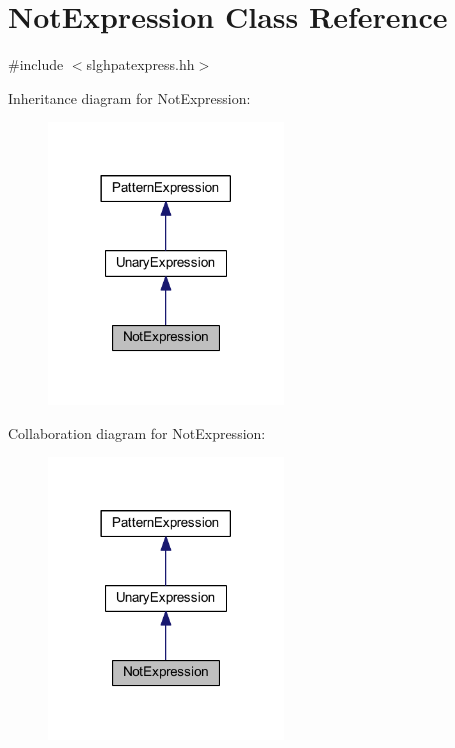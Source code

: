 \hypertarget{class_not_expression}{}\section{Not\+Expression Class Reference}
\label{class_not_expression}


{\ttfamily \#include $<$slghpatexpress.\+hh$>$}



Inheritance diagram for Not\+Expression\+:
\nopagebreak
\begin{figure}[H]
\begin{center}
\leavevmode
\includegraphics[width=177pt]{class_not_expression__inherit__graph}
\end{center}
\end{figure}


Collaboration diagram for Not\+Expression\+:
\nopagebreak
\begin{figure}[H]
\begin{center}
\leavevmode
\includegraphics[width=177pt]{class_not_expression__coll__graph}
\end{center}
\end{figure}
